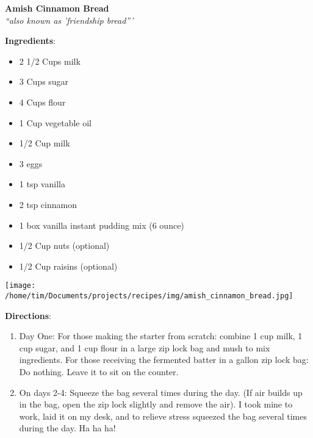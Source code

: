 \documentclass[11pt, twoside, openany]{book}
\begin{document}
\noindent\begin{minipage}[t]{\linewidth}%
{\Large\textbf{Amish Cinnamon Bread}} \label{amish-cinnamon-bread}\hfill\textit{}\\
\textit{``also known as 'friendship bread'''}\\
\noindent\begin{minipage}[t]{0.78\linewidth}%
\textbf{Ingredients}:\vspace{-3mm}
\begin{multicols}{2}
\begin{itemize}\setlength\itemsep{-1mm}
\item 2 1/2 Cups milk
\item 3 Cups sugar
\item 4 Cups flour
\item 1 Cup vegetable oil
\item 1/2 Cup milk
\item 3 eggs
\item 1 tsp vanilla
\item 2 tsp cinnamon
\item 1 box vanilla instant pudding mix (6 ounce)
\item 1/2 Cup nuts (optional)
\item 1/2 Cup raisins (optional)
\end{itemize}
\end{multicols}
\end{minipage}
\noindent\begin{minipage}[t]{0.18\linewidth}
\centering \strut\vspace*{-\baselineskip}\newline
\texttt{[image: /home/tim/Documents/projects/recipes/img/amish\_cinnamon\_bread.jpg]}\\
\end{minipage}\vspace{3mm}
\textbf{Directions}:
\vspace{-3mm}\begin{enumerate}\setlength\itemsep{-1mm}
\item Day One: For those making the starter from scratch: combine 1 cup milk, 1 cup sugar, and 1 cup flour in a large zip lock bag and mush to mix ingredients. For those receiving the fermented batter in a gallon zip lock bag: Do nothing. Leave it to sit on the counter.
\item On days 2-4: Squeeze the bag several times during the day. (If air builds up in the bag, open the zip lock slightly and remove the air). I took mine to work, laid it on my desk, and to relieve stress squeezed the bag several times during the day. Ha ha ha!

\end{enumerate}
\end{minipage}
\end{document}
